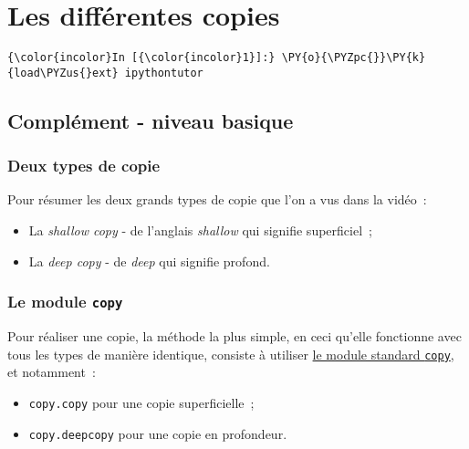     
    
    
    

    

    \hypertarget{les-diffuxe9rentes-copies}{%
\section{Les différentes copies}\label{les-diffuxe9rentes-copies}}

    \begin{Verbatim}[commandchars=\\\{\}]
{\color{incolor}In [{\color{incolor}1}]:} \PY{o}{\PYZpc{}}\PY{k}{load\PYZus{}ext} ipythontutor
\end{Verbatim}


    \hypertarget{compluxe9ment---niveau-basique}{%
\subsection{Complément - niveau
basique}\label{compluxe9ment---niveau-basique}}

    \hypertarget{deux-types-de-copie}{%
\subsubsection{Deux types de copie}\label{deux-types-de-copie}}

    Pour résumer les deux grands types de copie que l'on a vus dans la
vidéo~:

\begin{itemize}
\tightlist
\item
  La \emph{shallow copy} - de l'anglais \emph{shallow} qui signifie
  superficiel~;
\item
  La \emph{deep copy} - de \emph{deep} qui signifie profond.
\end{itemize}

    \hypertarget{le-module-copy}{%
\subsubsection{\texorpdfstring{Le module
\texttt{copy}}{Le module copy}}\label{le-module-copy}}

    Pour réaliser une copie, la méthode la plus simple, en ceci qu'elle
fonctionne avec tous les types de manière identique, consiste à utiliser
\href{https://docs.python.org/3/library/copy.html}{le module standard
\texttt{copy}}, et notamment~:

\begin{itemize}
\tightlist
\item
  \texttt{copy.copy} pour une copie superficielle~;
\item
  \texttt{copy.deepcopy} pour une copie en profondeur.
\end{itemize}

